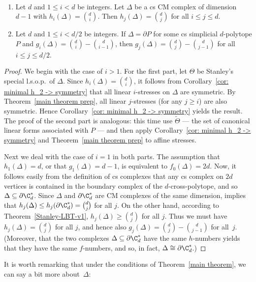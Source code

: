 \begin{theorem}\label{main theorem} \ \samepage
\begin{enumerate}
\item 
Let $d$ and $1\leq i<d$ be integers. Let $\Delta$ be a cs CM complex of dimension $d-1$ with $h_i(\Delta)=\binom{d}{i}$. Then $h_j(\Delta)=\binom{d}{j}$ for all $i\leq j\leq d$. 
\item Let $d$ and $1\leq i<d/2$ be integers. If $\Delta=\partial P$ for some cs simplicial $d$-polytope $P$ and $g_i(\Delta)=\binom{d}{i}-\binom{d}{i-1}$, then $g_j(\Delta)=\binom{d}{j}-\binom{d}{j-1}$ for all $i\leq j\leq d/2$. 
\end{enumerate}
\end{theorem}
\begin{proof}
	We begin with the case of $i>1$. For the first part, let $\Theta$ be Stanley's special l.s.o.p.~of $\Delta$. Since $h_i(\Delta)=\binom{d}{i}$, it follows from Corollary~\ref{cor: minimal h_2 -> symmetry} that all linear $i$-stresses on $\Delta$ are symmetric. By Theorem~\ref{main theorem prep}, all linear $j$-stresses (for any $j\geq i$) are also symmetric. Hence Corollary~\ref{cor: minimal h_2 -> symmetry} yields the result. The proof of the second part is analogous: this time use $\widetilde{\Theta}$ --- the set of canonical linear forms associated with $P$ --- and then apply Corollary~\ref{cor: minimal h_2 -> symmetry} and Theorem~\ref{main theorem prep} to affine stresses.
	
	Next we deal with the case of $i=1$ in both parts. The assumption that $h_1(\Delta)=d$, or that $g_1(\Delta)=d-1$, is equivalent to $f_0(\Delta)=2d$. Now, it follows easily from the definition of cs complexes that any cs complex on $2d$ vertices is contained in the boundary complex of the $d$-cross-polytope, and so $\Delta\subseteq \partial \C^*_d$. Since $\Delta$ and $\partial \C^*_d$ are CM complexes of the same dimension, \cite[Theorem 2.1]{Stanley-93} implies that $h_j(\Delta)\leq h_j(\partial \C^*_d)=\binom{d}{j}$ for all $j$. On the other hand, according to Theorem~\ref{Stanley-LBT-v1}, $h_j(\Delta)\geq \binom{d}{j}$ for all $j$. Thus we must have $h_j(\Delta)=\binom{d}{j}$ for all $j$, and hence also $g_j(\Delta)=\binom{d}{j}-\binom{d}{j-1}$ for all~$j$. (Moreover, that the two complexes $\Delta\subseteq \partial\C^*_d$ have the same $h$-numbers yields that they have the same $f$-numbers, and so, in fact, $\Delta\cong\partial\C^*_d$.)
\end{proof}

It is worth remarking that under the conditions of Theorem~\ref{main theorem}, we can say a bit more about~$\Delta$:


